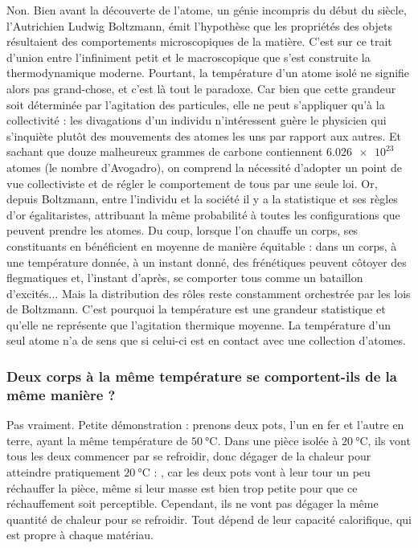 Non. Bien avant la découverte de l'atome, un génie incompris du début du  siècle, l'Autrichien Ludwig Boltzmann, émit l'hypothèse que les propriétés des objets résultaient des comportements microscopiques de la matière. C'est sur ce trait d'union entre l'infiniment petit et le macroscopique que s'est construite la thermodynamique moderne. Pourtant, la température d'un atome isolé ne signifie alors pas grand-chose, et c'est là tout le paradoxe. Car bien que cette grandeur soit déterminée par l'agitation des particules, elle ne peut s'appliquer qu'à la collectivité : les divagations d'un individu n'intéressent guère le physicien qui s'inquiète plutôt des mouvements des atomes les uns par rapport aux autres. Et sachant que douze malheureux grammes de carbone contiennent \(\num{6.026e23}\) atomes (le nombre d'Avogadro), on comprend la nécessité d'adopter un point de vue collectiviste et de régler le comportement de tous par une seule loi. Or, depuis Boltzmann, entre l'individu et la société il y a la statistique et ses règles d'or égalitaristes, attribuant la même probabilité à toutes les configurations que peuvent prendre les atomes. Du coup, lorsque l'on chauffe un corps, ses constituants en bénéficient en moyenne de manière équitable : dans un corps, à une température donnée, à un instant donné, des frénétiques peuvent côtoyer des flegmatiques et, l'instant d'après, se comporter tous comme un bataillon d'excités... Mais la distribution des rôles reste constamment orchestrée par les lois de Boltzmann. C'est pourquoi la température est une grandeur statistique et qu'elle ne représente que l'agitation thermique moyenne. La température d'un seul atome n'a de sens que si celui-ci est en contact avec une collection d'atomes.

\subsubsection{Deux corps à la même température se comportent-ils de la même manière ?}

Pas vraiment. Petite démonstration : prenons deux pots, l'un en fer et l'autre en terre, ayant la même température de \(\SI{50}{\degreeCelsius}\). Dans une pièce isolée à \(\SI{20}{\degreeCelsius}\), ils vont tous les deux commencer par se refroidir, donc dégager de la chaleur pour atteindre pratiquement \(\SI{20}{\degreeCelsius}\) : , car les deux pots vont à leur tour un peu réchauffer la pièce, même si leur masse est bien trop petite pour que ce réchauffement soit perceptible. Cependant, ils ne vont pas dégager la même quantité de chaleur pour se refroidir. Tout dépend de leur capacité calorifique, qui est propre à chaque matériau.

